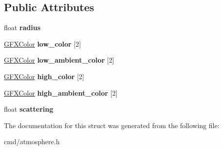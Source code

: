 \subsection*{Public Attributes}
\begin{DoxyCompactItemize}
\item 
float {\bfseries radius}\hypertarget{structAtmosphere_1_1Parameters_adfc913b2126fd378e3f23ce9b52e5eeb}{}\label{structAtmosphere_1_1Parameters_adfc913b2126fd378e3f23ce9b52e5eeb}

\item 
\hyperlink{structGFXColor}{G\+F\+X\+Color} {\bfseries low\+\_\+color} \mbox{[}2\mbox{]}\hypertarget{structAtmosphere_1_1Parameters_a7a9f9aa1f97514bb8335a58e44e9c1f5}{}\label{structAtmosphere_1_1Parameters_a7a9f9aa1f97514bb8335a58e44e9c1f5}

\item 
\hyperlink{structGFXColor}{G\+F\+X\+Color} {\bfseries low\+\_\+ambient\+\_\+color} \mbox{[}2\mbox{]}\hypertarget{structAtmosphere_1_1Parameters_adee327af7aabe303f162c446915ba317}{}\label{structAtmosphere_1_1Parameters_adee327af7aabe303f162c446915ba317}

\item 
\hyperlink{structGFXColor}{G\+F\+X\+Color} {\bfseries high\+\_\+color} \mbox{[}2\mbox{]}\hypertarget{structAtmosphere_1_1Parameters_a3b343aea53b0c931a6e8368d7d9e9230}{}\label{structAtmosphere_1_1Parameters_a3b343aea53b0c931a6e8368d7d9e9230}

\item 
\hyperlink{structGFXColor}{G\+F\+X\+Color} {\bfseries high\+\_\+ambient\+\_\+color} \mbox{[}2\mbox{]}\hypertarget{structAtmosphere_1_1Parameters_adbfb1d438db311a27901dc2d3103c49f}{}\label{structAtmosphere_1_1Parameters_adbfb1d438db311a27901dc2d3103c49f}

\item 
float {\bfseries scattering}\hypertarget{structAtmosphere_1_1Parameters_a54a2ee3cb65b67d29f224d061e72f751}{}\label{structAtmosphere_1_1Parameters_a54a2ee3cb65b67d29f224d061e72f751}

\end{DoxyCompactItemize}


The documentation for this struct was generated from the following file\+:\begin{DoxyCompactItemize}
\item 
cmd/atmosphere.\+h\end{DoxyCompactItemize}
